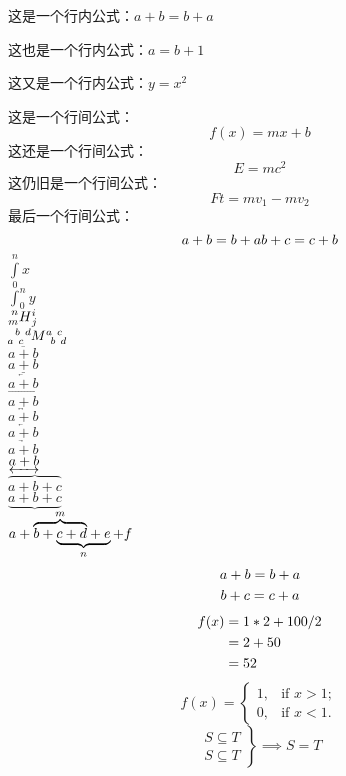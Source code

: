 \documentclass[UTF8, fontset=ubuntu]{ctexart}
\begin{document}
	这是一个行内公式：$a+b=b+a$\par
	这也是一个行内公式：\( a=b+1\)\par
	这又是一个行内公式：\begin{math}y=x^2\end{math}\par
	这是一个行间公式：$$f(x)=mx+b$$
	\indent 这还是一个行间公式：\[E=mc^2\]
	\indent 这仍旧是一个行间公式：\begin{displaymath}Ft=mv_1-mv_2\end{displaymath}
	\indent 最后一个行间公式：\begin{equation}a+b=b+a\\b+c=c+b\end{equation}
	$\int\limits_0^n x$\\
	$\int\nolimits_0^n y$\\
	$\prescript{n}{m}{H}^i_j$\\
	$\tensor[_a^b_c^d]{M}{^a_b^c_d}$\\
	$\overline{a+b}$\\
	$\underline{a+b}$\\
	$\overleftarrow{a+b}$\\
	$\overrightarrow{a+b}$\\
	$\overleftrightarrow{a+b}$\\
	$\underleftarrow{a+b}$\\
	$\underrightarrow{a+b}$\\
	$\underleftrightarrow{a+b}$\\
	$\overbrace{a+b+c}$\\
	$\underbrace{a+b+c}$\\
	$a+\rlap{$\overbrace{\phantom{b+c+d}}^{m}$}b+\underbrace{c+d+e}_{n}+f$\\
\begin{gather}
	a+b=b+a\notag \\
	b+c=c+a
\end{gather}
\begin{align}
	f(x)&=1*2+100/2 \notag \\
	       &=2+50\notag \\
	       &=52
\end{align}
\begin{equation}
f(x) = \begin{cases}
1, & \text{if } x > 1;\\
0, & \text{if } x < 1.
\end{cases}
\end{equation}
\begin{equation}
\left.\begin{gathered}
	S \subseteq T\\
	S \subseteq T
	\end{gathered} \right\}
	\implies S = T
\end{equation}
\end{document}
